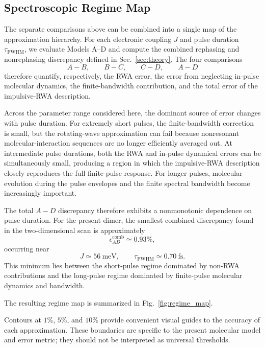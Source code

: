 \subsection{Spectroscopic Regime Map}
\label{subsec:regime_map}

The separate comparisons above can be combined into a single map of
the approximation hierarchy.
For each electronic coupling $J$ and pulse duration
$\tau_{\mathrm{FWHM}}$, we evaluate Models A--D and compute the
combined rephasing and nonrephasing discrepancy defined in
Sec.~\ref{sec:theory}.
The four comparisons
%
\begin{equation}
A-B,\qquad
B-C,\qquad
C-D,\qquad
A-D
\end{equation}
%
therefore quantify, respectively, the RWA error, the error from
neglecting in-pulse molecular dynamics, the finite-bandwidth
contribution, and the total error of the impulsive-RWA description.

Across the parameter range considered here, the dominant source of
error changes with pulse duration.
For extremely short pulses, the finite-bandwidth correction
is small, but the rotating-wave approximation can fail
because nonresonant molecular-interaction sequences are no longer
efficiently averaged out.
At intermediate pulse durations, both the RWA and in-pulse dynamical
errors can be simultaneously small, producing a region in which the
impulsive-RWA description closely reproduces the full finite-pulse
response.
For longer pulses, molecular evolution during the pulse envelopes and
the finite spectral bandwidth become increasingly important.

The total $A-D$ discrepancy therefore exhibits a nonmonotonic
dependence on pulse duration.
For the present dimer, the smallest combined discrepancy found in the
two-dimensional scan is approximately
%
\begin{equation}
\epsilon_{AD}^{\mathrm{comb}}
\simeq 0.93\%,
\end{equation}
%
occurring near
%
\begin{equation}
J\simeq56~\mathrm{meV},
\qquad
\tau_{\mathrm{FWHM}}\simeq0.70~\mathrm{fs}.
\end{equation}
%
This minimum lies between the short-pulse regime dominated by
non-RWA contributions and the long-pulse regime dominated by
finite-pulse molecular dynamics and bandwidth.

The resulting regime map is summarized in
Fig.~\ref{fig:regime_map}.

Contours at $1\%$, $5\%$, and $10\%$ provide convenient visual guides
to the accuracy of each approximation.
These boundaries are specific to the present molecular model and
error metric; they should not be interpreted as universal thresholds.

